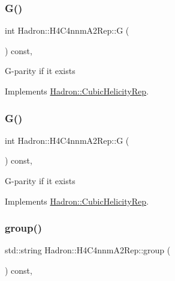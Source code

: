 \subsubsection{\texorpdfstring{G()}{G()}\hspace{0.1cm}{\footnotesize\ttfamily [1/2]}}
{\footnotesize\ttfamily int Hadron\+::\+H4\+C4nnm\+A2\+Rep\+::G (\begin{DoxyParamCaption}{ }\end{DoxyParamCaption}) const\hspace{0.3cm}{\ttfamily [inline]}, {\ttfamily [virtual]}}

G-\/parity if it exists 

Implements \mbox{\hyperlink{structHadron_1_1CubicHelicityRep_a50689f42be1e6170aa8cf6ad0597018b}{Hadron\+::\+Cubic\+Helicity\+Rep}}.

\mbox{\label{structHadron_1_1H4C4nnmA2Rep_a5c05be95f9244ace91a9e81832e816e8}} 
\subsubsection{\texorpdfstring{G()}{G()}\hspace{0.1cm}{\footnotesize\ttfamily [2/2]}}
{\footnotesize\ttfamily int Hadron\+::\+H4\+C4nnm\+A2\+Rep\+::G (\begin{DoxyParamCaption}{ }\end{DoxyParamCaption}) const\hspace{0.3cm}{\ttfamily [inline]}, {\ttfamily [virtual]}}

G-\/parity if it exists 

Implements \mbox{\hyperlink{structHadron_1_1CubicHelicityRep_a50689f42be1e6170aa8cf6ad0597018b}{Hadron\+::\+Cubic\+Helicity\+Rep}}.

\mbox{\label{structHadron_1_1H4C4nnmA2Rep_ae437f39da33de8e2ad9b152325fa7ce2}} 
\subsubsection{\texorpdfstring{group()}{group()}\hspace{0.1cm}{\footnotesize\ttfamily [1/3]}}
{\footnotesize\ttfamily std\+::string Hadron\+::\+H4\+C4nnm\+A2\+Rep\+::group (\begin{DoxyParamCaption}{ }\end{DoxyParamCaption}) const\hspace{0.3cm}{\ttfamily [inline]}, {\ttfamily [virtual]}}

